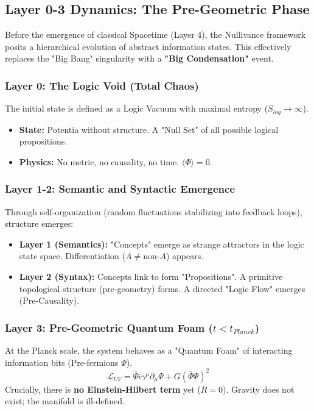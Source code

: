 \documentclass[a4paper,12pt]{article}
\begin{document}
\subsection{Layer 0-3 Dynamics: The Pre-Geometric Phase}

Before the emergence of classical Spacetime (Layer 4), the Nullivance framework posits a hierarchical evolution of abstract information states. This effectively replaces the "Big Bang" singularity with a \textbf{"Big Condensation"} event.

\subsubsection{Layer 0: The Logic Void (Total Chaos)}
The initial state is defined as a Logic Vacuum with maximal entropy ($S_{log} \to \infty$).
\begin{itemize}
    \item \textbf{State:} Potentia without structure. A "Null Set" of all possible logical propositions.
    \item \textbf{Physics:} No metric, no causality, no time. $\langle \Phi \rangle = 0$.
\end{itemize}

\subsubsection{Layer 1-2: Semantic and Syntactic Emergence}
Through self-organization (random fluctuations stabilizing into feedback loops), structure emerges:
\begin{itemize}
    \item \textbf{Layer 1 (Semantics):} "Concepts" emerge as strange attractors in the logic state space. Differentiation ($A \neq \text{non-}A$) appears.
    \item \textbf{Layer 2 (Syntax):} Concepts link to form "Propositions". A primitive topological structure (pre-geometry) forms. A directed "Logic Flow" emerges (Pre-Causality).
\end{itemize}

\subsubsection{Layer 3: Pre-Geometric Quantum Foam ($t < t_{Planck}$)}
At the Planck scale, the system behaves as a "Quantum Foam" of interacting information bits (Pre-fermions $\Psi$).
\begin{equation}
    \mathcal{L}_{UV} = \bar{\Psi} i \gamma^\mu \partial_\mu \Psi + G (\bar{\Psi} \Psi)^2
\end{equation}
Crucially, there is \textbf{no Einstein-Hilbert term} yet ($R=0$). Gravity does not exist; the manifold is ill-defined.
\end{document}
